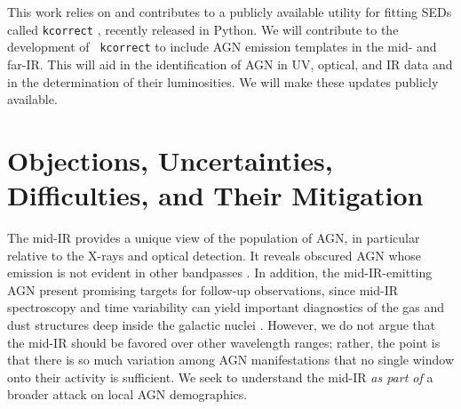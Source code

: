 \documentclass[12pt, preprint]{hacked-aastex}
\begin{document}
This work relies on and contributes to a publicly available utility
for fitting SEDs called {\tt kcorrect} \cite{blanton07b}, recently
released in Python.  We will contribute to the development of {\tt
  kcorrect} to include AGN emission templates in the mid- and far-IR.
This will aid in the identification of AGN in UV, optical, and IR data
and in the determination of their luminosities. We will make these
updates publicly available.


\section{Objections, Uncertainties, Difficulties, and Their Mitigation}
\label{sec:difficulties}


 The mid-IR provides a unique
view of the population of AGN, in particular relative to the X-rays
and optical detection. It reveals obscured AGN whose emission is not
evident in other bandpasses \cite{sajina22a}. In addition, the
mid-IR-emitting AGN present promising targets for follow-up
observations, since mid-IR spectroscopy and time variability can yield
important diagnostics of the gas and dust structures deep inside the
galactic nuclei \cite{goold23a}. However, we do not argue that the
mid-IR should be favored over other wavelength ranges; rather, the
point is that there is so much variation among AGN manifestations that
no single window onto their activity is sufficient. We seek to
understand the mid-IR {\it as part of} a broader attack on local AGN
demographics.
\end{document}
